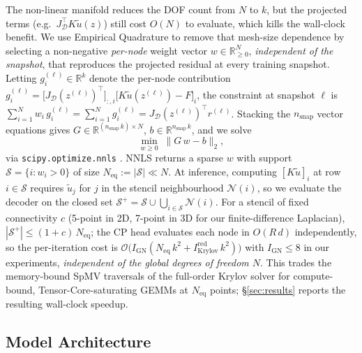 \documentclass{article}
\begin{document}
The non-linear manifold reduces the DOF count from $N$ to $k$, but
the projected terms (e.g.\ $J_\mathcal{D}^\top K \tilde{u}(z)$) still
cost $O(N)$ to evaluate, which kills the wall-clock benefit. We use
Empirical Quadrature \citep{Hernandez2017EQ} to remove that mesh-size
dependence by selecting a non-negative \emph{per-node} weight vector
$w \in \mathbb{R}^N_{\geq 0}$, \emph{independent of the snapshot},
that reproduces the projected residual at every training snapshot.
Letting $g_i^{(\ell)} \in \mathbb{R}^k$ denote the per-node
contribution
$g_i^{(\ell)} = \bigl[J_\mathcal{D}(z^{(\ell)})^\top\bigr]_{:,i}
   \bigl[K\tilde{u}(z^{(\ell)}) - F\bigr]_i$,
the constraint at snapshot $\ell$ is
$\sum_{i=1}^{N} w_i\, g_i^{(\ell)}
   = \sum_{i=1}^{N} g_i^{(\ell)}
   = J_\mathcal{D}(z^{(\ell)})^\top r^{(\ell)}$.
Stacking the $n_\mathrm{snap}$ vector equations gives
$G \in \mathbb{R}^{(n_\mathrm{snap}\,k)\times N}$,
$b \in \mathbb{R}^{n_\mathrm{snap}\,k}$, and we solve
\begin{equation}
  \min_{w \geq 0}\; \|G\, w - b\|_2,
  \label{eq:nnls}
\end{equation}
via \texttt{scipy.optimize.nnls} \citep{Virtanen2020SciPy}. NNLS returns a sparse $w$ with
support $\mathcal{S} = \{i : w_i > 0\}$ of size $N_\mathrm{eq} :=
|\mathcal{S}| \ll N$. At inference, computing
$[K\tilde{u}]_i$ at row $i \in \mathcal{S}$ requires $\tilde{u}_j$
for $j$ in the stencil neighbourhood $\mathcal{N}(i)$, so we
evaluate the decoder on the closed set
$\mathcal{S}^+ = \mathcal{S} \cup \bigcup_{i\in\mathcal{S}}
\mathcal{N}(i)$. For a stencil of fixed connectivity $c$ (5-point
in 2D, 7-point in 3D for our finite-difference Laplacian),
$|\mathcal{S}^+| \leq (1+c)\,N_\mathrm{eq}$; the CP head evaluates
each node in $O(R\,d)$ independently, so the per-iteration cost is
$\mathcal{O}\!\bigl(I_\mathrm{GN}(N_\mathrm{eq}\,k^2 +
I^\mathrm{red}_\mathrm{Krylov}\,k^2)\bigr)$ with
$I_\mathrm{GN}\!\leq\!8$ in our experiments, \emph{independent of
the global degrees of freedom $N$}. This trades the memory-bound SpMV traversals of the
full-order Krylov solver \citep[which scale as
$\mathcal{O}(I_\mathrm{Krylov}\!\cdot\!N_z)$ with operator condition
number degrading at refinement,][]{Saad2003} for compute-bound,
Tensor-Core-saturating GEMMs at $N_\mathrm{eq}$ points; \S\ref{sec:results}
reports the resulting wall-clock speedup.

\subsection{Model Architecture}
\label{sec:decoder}
\end{document}
